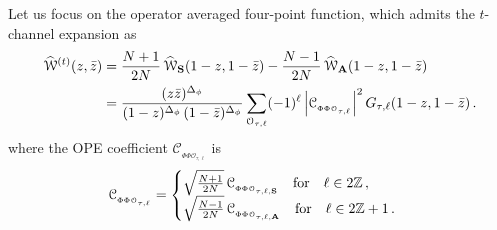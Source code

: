 \documentclass[11pt]{article}
\newcommand{\zb}{\bar{z}}
\newcommand{\cope}[1]{\mathcal{C}_{_{#1}}}
\begin{document}
Let us focus on the operator averaged four-point function, which admits the $t$-channel expansion as
%
\begin{equation}\label{eq:t-channel_avg}
\begin{split}
\widehat{\mathcal{W}}^{(t)}(z,\zb) 
& =
  \frac{N+1}{2N}\, \widehat{\mathcal{W}}_{\bf S}(1-z,1-\zb)- \frac{N-1}{2N} \, 
  \widehat{\mathcal{W}}_{\bf A}(1-z,1-\zb)
\\
&=\frac{(z\zb)^{\Delta_{\phi}}}{(1-z)^{\Delta_\phi}\, (1-\zb)^{\Delta_\phi}}\sum_{\mathcal{O}_{\tau,\ell}}(-1)^\ell \left|\cope{\Phi\Phi\mathcal{O}_{\tau,\ell}}\right|^2 G_{\tau,\ell}(1-z,1-\zb)\,.
\end{split}
\end{equation}
%
where the OPE coefficient $\cope{\Phi\Phi\mathcal{O}_{\tau,\ell}}$ is
%
\begin{equation}
\cope{\Phi\Phi\mathcal{O}_{\tau,\ell}}=
\begin{cases}
  \sqrt{\frac{N+1}{2N}}\, \cope{\Phi\Phi\mathcal{O}_{\tau,\ell,{\bf S}}} 
    \quad{\rm for}\quad \ell\in2{\mathbb Z}\,,
\\
\sqrt{\frac{N-1}{2N}}\, \cope{\Phi\Phi\mathcal{O}_{\tau,\ell,{\bf A}}}
  \quad{\rm for}\quad \ell\in2{\mathbb Z}+1\,.
\end{cases}
\end{equation}
%
\end{document}
